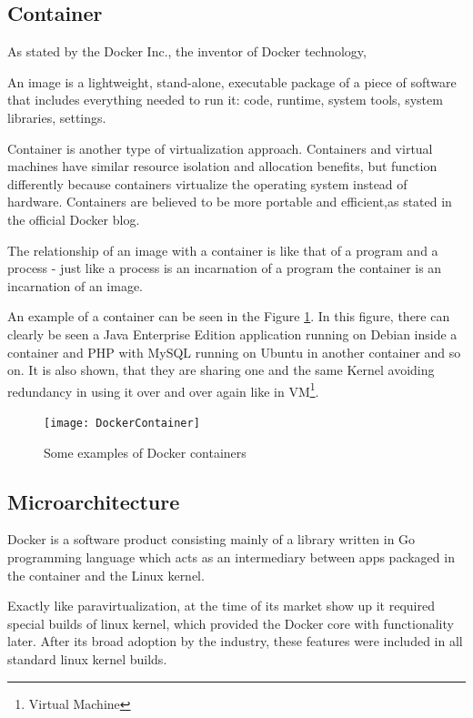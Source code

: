 \subsection{Container}

As stated by the Docker Inc., the inventor of Docker technology,

\begin{definition}
An image is a lightweight, stand-alone,
executable package of a piece of software that includes everything
needed to run it: code, runtime,
system tools, system libraries, settings\cite{DockerDefinition}.
\end{definition}

Container is another type of virtualization approach.
Containers and virtual machines have
similar resource isolation and allocation benefits,
but function differently because containers
virtualize the operating system instead of hardware.
Containers are believed to be more portable and
efficient,as stated in
the official Docker blog\cite{DockerEfficiency}.

The relationship of an image with
a container is like that of a program and a process -
just like a process is an incarnation of a program
the container is an incarnation of an image.

An example of a container can be
seen in the Figure \ref{fig:DockerContainerPic}.
In this figure, there can clearly be seen a Java Enterprise Edition application
running on Debian inside a container and PHP with MySQL running
on Ubuntu in another container and so on.
It is also shown, that they are sharing
one and the same Kernel avoiding redundancy in using it
over and over again like in VM\footnote{Virtual Machine}.

\begin{figure}
\texttt{[image: DockerContainer]}
\caption{Some examples of Docker containers}
\cite{DockerContainerPic}
\label{fig:DockerContainerPic}
\end{figure}

\subsection{Microarchitecture}

Docker is a software product consisting mainly of a
library written in Go programming language
which acts as an intermediary between apps packaged
in the container and the Linux kernel.

Exactly like paravirtualization, at the time of its market show up
it required special builds of linux kernel, which provided the Docker core with
functionality later. After its broad adoption by the industry, these features
were included in all standard linux kernel builds.

